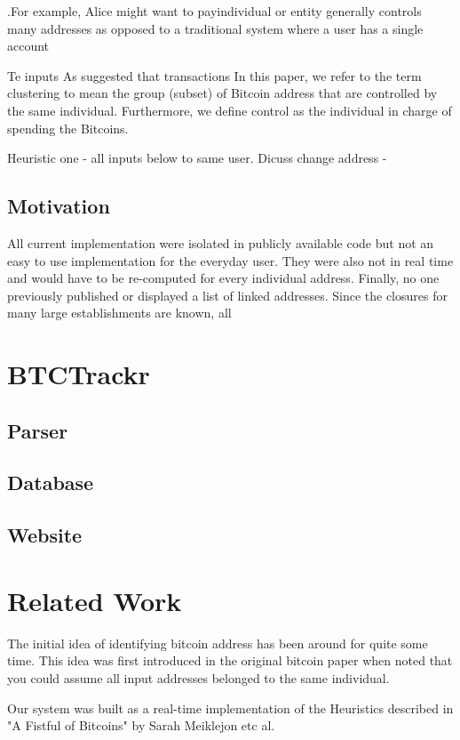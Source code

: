 \documentclass[10pt, letterpaper, twocolumn, twoside]{article}
\begin{document}
.For example, Alice might want to payindividual or entity generally controls many addresses as opposed to a traditional system where a user has a single account

Te inputs As suggested that transactions In this paper, we refer to the term clustering to mean the group (subset) of Bitcoin address that are controlled by the same individual. Furthermore, we define control as the individual in charge of spending the Bitcoins.

Heuristic one - all inputs below to same user.
Dicuss change address - 

\subsection{Motivation}
All current implementation were isolated in publicly available code but not an easy to use implementation for the everyday user. They were also not in real time and would have to be re-computed for every individual address. Finally, no one previously published or displayed a list of linked addresses. Since the closures for many large establishments are known, all


\section{BTCTrackr}

\subsection{Parser}

\subsection{Database}

\subsection{Website}

\section{Related Work}
\label{related}
The initial idea of identifying bitcoin address has been around for quite some time. This idea was first introduced in the original bitcoin paper when noted that you could assume all input addresses belonged to the same individual.

Our system was built as a real-time implementation of the Heuristics described in "A Fistful of Bitcoins" by Sarah Meiklejon etc al. 
\end{document}

